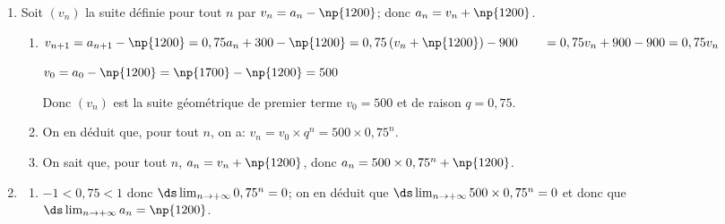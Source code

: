 \begin{enumerate}
\begin{enumerate}

On a donc démontré que, pour tout $n$, $\np{1200} \leqslant a_{n+1} \leqslant a_{n} \leqslant \np{1700}$.
		
		\item Étude de la convergence de la suite $\left(a_{n}\right)$.
		
		
La suite $(a_n)_{n\in\N}$ est décroissante et minorée donc, d'après le théorème de la convergence monotone, elle est convergente.		
		
	\end{enumerate}
\item Soit $\left(v_{n}\right)$ la suite définie pour tout $n$ par $v_{n}=a_{n}- \np{1200}$; donc $a_n=v_n+\np{1200}$.
	\begin{enumerate}
		\item %
$v_{n+1}	= a_{n+1} -\np{1200} = 0,75 a_n +300 -\np{1200}
= 0,75\left (v_n+\np{1200}\right ) -900\\
\phantom{v_{n+1}}
= 0,75 v_n +900-900 = 0,75v_n$	

$v_0=a_0-\np{1200}=\np{1700} - \np{1200} = 500$

Donc $(v_n)$ est la suite géométrique de premier terme $v_0=500$ et de raison $q=0,75$.		
		\item %
On en déduit que, pour tout $n$, on a: $v_n=v_0\times q^n = 500\times  0,75^n$.
		
		\item %
On sait que, pour tout $n$, $a_n=v_n+\np{1200}$, donc 	$a_n=500\times 0,75^n+\np{1200}$.
	\end{enumerate}
\item 
	\begin{enumerate}
		\item %
$-1<0,75<1$ donc $\ds\lim_{n\to +\infty} 0,75^n=0$;
on en déduit que $\ds\lim_{n\to +\infty}500\times 0,75^n=0$
et donc que $\ds\lim_{n\to +\infty} a_n=\np{1200}$.
				

\end{enumerate}
\end{enumerate}
